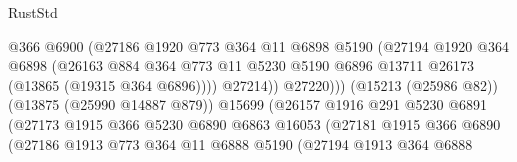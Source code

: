 \begin{lexlean}{RustStd}
\begin{coremodule}
                                        @366
                                        @6900
                                        (@27186
                                          @1920
                                          @773
                                          @364
                                          @11
                                          @6898
                                          @5190
                                          (@27194
                                            @1920
                                            @364
                                            @6898
                                            (@26163
                                              @884
                                              @364
                                              @773
                                              @11
                                              @5230
                                              @5190
                                              @6896
                                              @13711
                                              @26173
                                              (@13865 (@19315 @364 @6896))))
                                          @27214))
                                      @27220)))
                                (@15213 (@25986 @82))
                                (@13875 (@25990 @14887 @879))
                                @15699
                                (@26157
                                  @1916
                                  @291
                                  @5230
                                  @6891
                                  (@27173
                                    @1915
                                    @366
                                    @5230
                                    @6890
                                    @6863
                                    @16053
                                    (@27181
                                      @1915
                                      @366
                                      @6890
                                      (@27186
                                        @1913
                                        @773
                                        @364
                                        @11
                                        @6888
                                        @5190
                                        (@27194
                                          @1913
                                          @364
                                          @6888

\end{coremodule}
\end{lexlean}
